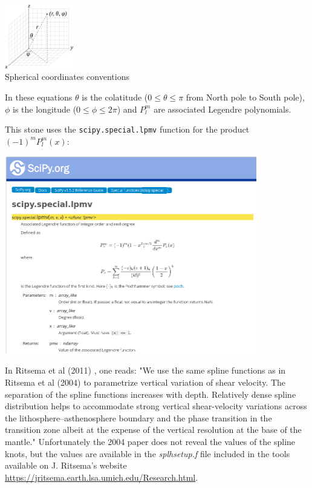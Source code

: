 \begin{center}
\includegraphics[width=3cm]{images/sphcoord}\\
{\captionfont Spherical coordinates conventions}
\end{center}

In these equations $\theta$ is the colatitude ($0\le\theta\le \pi$ from North pole to South pole), $\phi$
is the longitude ($0\le\phi\le 2\pi$) and $P_l^m$ are associated Legendre polynomials. 

This stone uses the {\tt scipy.special.lpmv} function for the product $(-1)^m P_l^m(x)$:
\begin{center}
\includegraphics[width=11cm]{python_codes/fieldstone_85/images/lpmv}
\end{center}

In Ritsema et al (2011) \cite{ridv11}, one reads: "We use the same 
spline functions as in Ritsema et al (2004) \cite{rivw04} to parametrize vertical 
variation of shear velocity. The separation of the spline functions
increases with depth. Relatively dense spline distribution helps to
accommodate strong vertical shear-velocity variations across the
lithosphere–asthenosphere boundary and the phase transition in the
transition zone albeit at the expense of the vertical resolution at
the base of the mantle."
Unfortunately the 2004 paper does not reveal the values of the spline knots, but the values
are available in the {\sl splhsetup.f} file included in the tools available 
on J. Ritsema's website \url{https://jritsema.earth.lsa.umich.edu/Research.html}.

